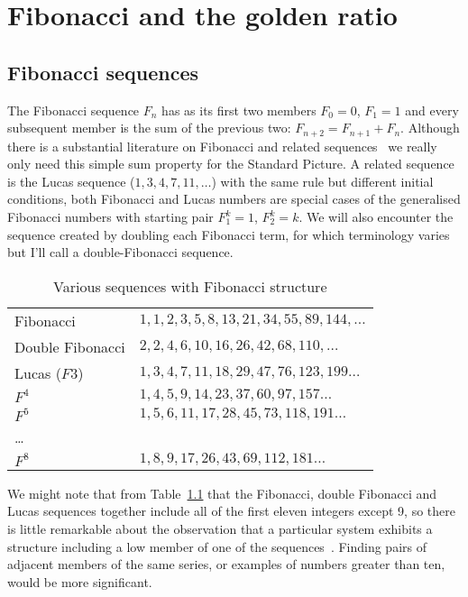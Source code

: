 

\chapter{Fibonacci and the golden ratio}

\label{CH:0}
\label{ch:0}
\section{Fibonacci sequences}

The Fibonacci sequence $F_n$ has as its first two members  $F_0=0$, $F_1=1$ and every subsequent member is the sum of the previous two:  $F_{n+2}=F_{n+1}+F_{n}$. 
Although there is a substantial literature on Fibonacci and related sequences~\cite{vajdaFibonacciLucasNumbers2008} we really only need this simple sum property for the Standard Picture. 
A related sequence is the Lucas sequence  ($1,3,4,7,11,\ldots$) with the same rule but different initial conditions, both Fibonacci and Lucas numbers are special cases of the generalised Fibonacci numbers with starting pair $F^k_1=1$, $F^k_2=k$. We will also encounter the sequence created by doubling each Fibonacci term, for which terminology varies but I'll call a double-Fibonacci sequence. 
%
\begin{table}[ht]
	\begin{center}
		\begin{tabular}{ll}
			\hline
			Fibonacci  &  $1,1,2,3,5,8,13,21,34,55,89,144,\ldots$ 
			\\
			Double Fibonacci & $2,2,4,6,10,16,26,42,68,110,\ldots$
			\\
			Lucas ($F3$)&      $ 1,3,4,7,11,18,29,47,76,123,199\ldots$
			\\
			$F^4$  & $1,4,5,9,14,23,37,60,97,157\ldots$
			\\
			$F^5$ & $1,5,6,11,17,28,45,73,118,191\ldots$
			\\
			\ldots &
			\\
			$F^8$ & $1,8,9,17,26,43,69,112,181\ldots$
			\\
			\hline
		\end{tabular}
		\caption{Various sequences with Fibonacci structure}
		\label{tab:sequences}
	\end{center}
\end{table}
%

We might note that from Table~\ref{tab:sequences} that the Fibonacci, double Fibonacci and Lucas sequences together include all  of the first eleven integers except 9, so there is little remarkable about the observation that a particular system exhibits a structure including a low member of one of the sequences~\cite{cookeFibonacciNumbersReveal2006}. Finding pairs of adjacent members of the same series, or examples of numbers greater than ten, would be more significant.

